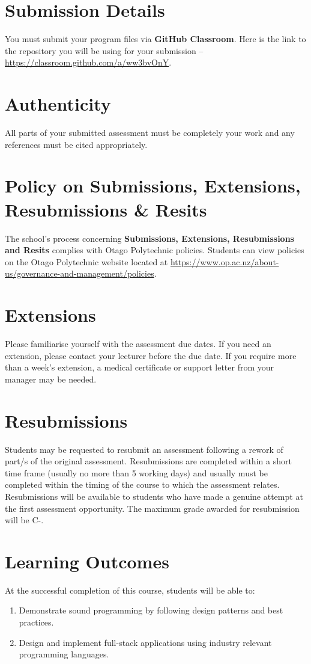 \documentclass{article}
\begin{document}
\section*{Submission Details}
You must submit your program files via \textbf{GitHub Classroom}. Here is the link to the repository you will be using for your submission – \href{https://classroom.github.com/a/ww3bvOnY}{https://classroom.github.com/a/ww3bvOnY}.

\section*{Authenticity}
All parts of your submitted assessment must be completely your work and any references must be cited appropriately.

\section*{Policy on Submissions, Extensions, Resubmissions \& Resits}
The school's process concerning \textbf{Submissions, Extensions, Resubmissions and Resits} complies with Otago Polytechnic policies. Students can view policies on the Otago Polytechnic website located at \href{https://www.op.ac.nz/about-us/governance-and-management/policies}{https://www.op.ac.nz/about-us/governance-and-management/policies}.

\section*{Extensions}
Please familiarise yourself with the assessment due dates. If you need an extension, please contact your lecturer before the due date. If you require more than a week's extension, a medical certificate or support letter from your manager may be needed.

\section*{Resubmissions}
Students may be requested to resubmit an assessment following a rework of part/s of the original assessment. Resubmissions are completed within a short time frame (usually no more than 5 working days) and usually must be completed within the timing of the course to which the assessment relates. Resubmissions will be available to students who have made a genuine attempt at the first assessment opportunity. The maximum grade awarded for resubmission will be C-.

\section*{Learning Outcomes}
At the successful completion of this course, students will be able to:
\begin{enumerate}
	\item Demonstrate sound programming by following design patterns and best practices.
	\item Design and implement full-stack applications using industry relevant programming languages.
\end{enumerate}
\end{document}
